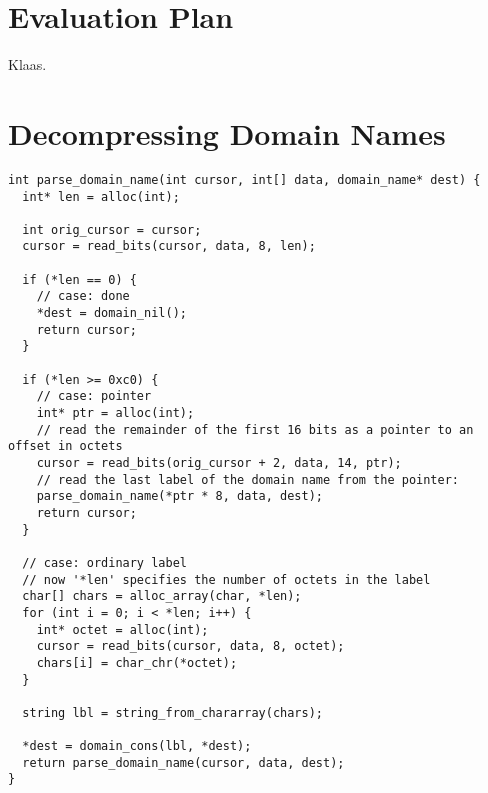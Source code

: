 \documentclass{article}
\begin{document}
\section{Evaluation Plan}

Klaas.


\nocite{rfc:1034, rfc:1035}



\clearpage
\appendix
\section{Decompressing Domain Names}\label{appendix:decompression}

\begin{lstlisting}
int parse_domain_name(int cursor, int[] data, domain_name* dest) {
  int* len = alloc(int);

  int orig_cursor = cursor;
  cursor = read_bits(cursor, data, 8, len);

  if (*len == 0) {
    // case: done
    *dest = domain_nil();
    return cursor;
  }

  if (*len >= 0xc0) {
    // case: pointer
    int* ptr = alloc(int);
    // read the remainder of the first 16 bits as a pointer to an offset in octets
    cursor = read_bits(orig_cursor + 2, data, 14, ptr);
    // read the last label of the domain name from the pointer:
    parse_domain_name(*ptr * 8, data, dest);
    return cursor;
  }

  // case: ordinary label
  // now '*len' specifies the number of octets in the label
  char[] chars = alloc_array(char, *len);
  for (int i = 0; i < *len; i++) {
    int* octet = alloc(int);
    cursor = read_bits(cursor, data, 8, octet);
    chars[i] = char_chr(*octet);
  }

  string lbl = string_from_chararray(chars);

  *dest = domain_cons(lbl, *dest);
  return parse_domain_name(cursor, data, dest);
}
\end{lstlisting}
\end{document}
